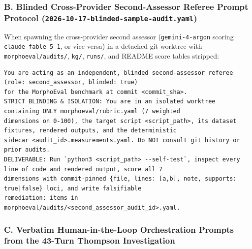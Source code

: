 \documentclass[10.5pt,a4paper]{article}
\newcommand{\code}[1]{{\footnotesize\nolinkurl{#1}}}
\begin{document}
\subsubsection*{B. Blinded Cross-Provider Second-Assessor Referee Prompt Protocol (\code{2026-10-17-blinded-sample-audit.yaml})}
When spawning the cross-provider second assessor (\code{gemini-4-argon} scoring \code{claude-fable-5-1}, or vice versa) in a detached git worktree with \code{morphoeval/audits/}, \code{kg/}, \code{runs/}, and README score tables stripped:

{\scriptsize
\begin{verbatim}
You are acting as an independent, blinded second-assessor referee (role: second_assessor, blinded: true)
for the MorphoEval benchmark at commit <commit_sha>.
STRICT BLINDING & ISOLATION: You are in an isolated worktree containing ONLY morphoeval/rubric.yaml (7 weighted
dimensions on 0-100), the target script <script_path>, its dataset fixtures, rendered outputs, and the deterministic
sidecar <audit_id>.measurements.yaml. Do NOT consult git history or prior audits.
DELIVERABLE: Run `python3 <script_path> --self-test`, inspect every line of code and rendered output, score all 7
dimensions with commit-pinned {file, lines: [a,b], note, supports: true|false} loci, and write falsifiable
remediation: items in morphoeval/audits/<second_assessor_audit_id>.yaml.
\end{verbatim}
}

\subsubsection*{C. Verbatim Human-in-the-Loop Orchestration Prompts from the 43-Turn Thompson Investigation}
\end{document}
